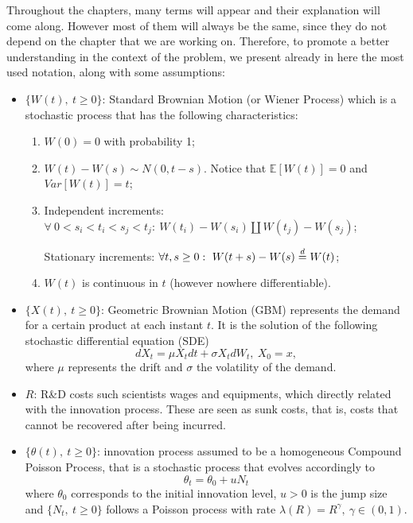 Throughout the chapters, many terms will appear and their explanation will come along. However most of them will always be the same, since they do not depend on the chapter that we are working on. Therefore, to promote a better understanding in the context of the problem, we present already in here the most used notation, along with some assumptions:
\begin{itemize}
	\item $\{ W(t), \ t \geq 0 \}$: Standard Brownian Motion (or Wiener Process) which is a stochastic process that has the following characteristics:
	\begin{enumerate}
		\item $W(0) = 0$ with probability 1;
		\item $W(t) - W(s) \sim N(0, t-s)$. Notice that $\mathds{E}[W(t)] = 0$ and $Var[W(t)] = t$;
		\item Independent increments: $\forall \ 0 < s_i < t_i < s_j < t_j: \ W(t_i) - W(s_i) \amalg W(t_j) - W(s_j) $;
		
		Stationary increments:  $\forall t,s \geq 0: \ W(t+s) - W(s) \buildrel d\over= W(t) $;
		\item $W(t)$ is continuous in $t$ (however nowhere differentiable).
	\end{enumerate}

	\item  $\{ X(t), \ t \geq 0 \}$: Geometric Brownian Motion (GBM) represents the demand for a certain product at each instant $t$. It is the solution of the following stochastic differential equation (SDE)
	$$ dX_t=\mu X_t dt + \sigma X_t d W_t, \ X_0=x, $$
	where $\mu$ represents the drift and $\sigma$ the volatility of the demand.
	
	\item $R$: R\&D costs such scientists wages and equipments, which directly related with the innovation process. These are seen as sunk costs, that is, costs that cannot be recovered after being incurred.
	
	\item  $\{ \theta(t), \ t \geq 0 \}$: innovation process assumed to be a homogeneous Compound Poisson Process, that is a stochastic process that evolves accordingly to
	$$\theta_t= \theta_0+ u N_t$$
	where $\theta_0$ corresponds to the initial innovation level, $u > 0$ is the jump size and $\{N_t, \ t \geq 0\}$ follows a Poisson process with rate $\lambda(R)=R^\gamma, \ \gamma \in (0,1)$.
	

\end{itemize}
